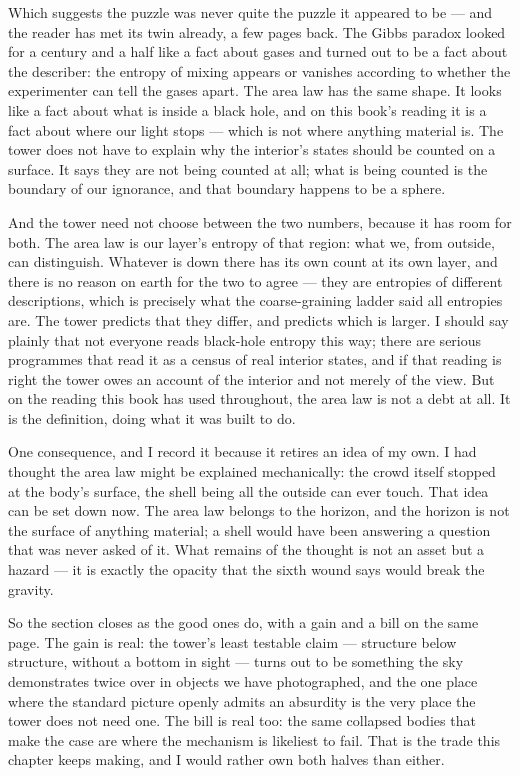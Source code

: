 Which suggests the puzzle was never quite the puzzle it appeared to be --- and the reader has met its twin already, a few pages back. The Gibbs paradox looked for a century and a half like a fact about gases and turned out to be a fact about the describer: the entropy of mixing appears or vanishes according to whether the experimenter can tell the gases apart. The area law has the same shape. It looks like a fact about what is inside a black hole, and on this book's reading it is a fact about where our light stops --- which is not where anything material is. The tower does not have to explain why the interior's states should be counted on a surface. It says they are not being counted at all; what is being counted is the boundary of our ignorance, and that boundary happens to be a sphere.

And the tower need not choose between the two numbers, because it has room for both. The area law is our layer's entropy of that region: what we, from outside, can distinguish. Whatever is down there has its own count at its own layer, and there is no reason on earth for the two to agree --- they are entropies of different descriptions, which is precisely what the coarse-graining ladder said all entropies are. The tower predicts that they differ, and predicts which is larger. I should say plainly that not everyone reads black-hole entropy this way; there are serious programmes that read it as a census of real interior states, and if that reading is right the tower owes an account of the interior and not merely of the view. But on the reading this book has used throughout, the area law is not a debt at all. It is the definition, doing what it was built to do.

One consequence, and I record it because it retires an idea of my own. I had thought the area law might be explained mechanically: the crowd itself stopped at the body's surface, the shell being all the outside can ever touch. That idea can be set down now. The area law belongs to the horizon, and the horizon is not the surface of anything material; a shell would have been answering a question that was never asked of it. What remains of the thought is not an asset but a hazard --- it is exactly the opacity that the sixth wound says would break the gravity.

So the section closes as the good ones do, with a gain and a bill on the same page. The gain is real: the tower's least testable claim --- structure below structure, without a bottom in sight --- turns out to be something the sky demonstrates twice over in objects we have photographed, and the one place where the standard picture openly admits an absurdity is the very place the tower does not need one. The bill is real too: the same collapsed bodies that make the case are where the mechanism is likeliest to fail. That is the trade this chapter keeps making, and I would rather own both halves than either.

